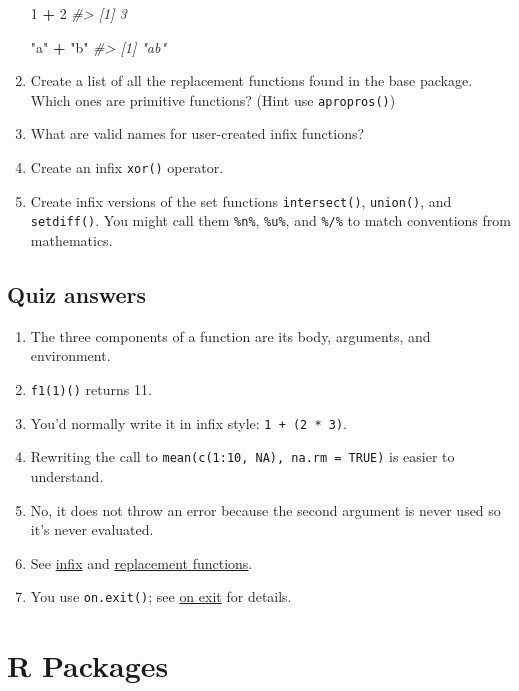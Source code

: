 \documentclass[]{book}
\newenvironment{Shaded}{\begin{snugshade}}{\end{snugshade}}
\newcommand{\CommentTok}[1]{\textcolor[rgb]{0.56,0.35,0.01}{\textit{#1}}}
\newcommand{\DecValTok}[1]{\textcolor[rgb]{0.00,0.00,0.81}{#1}}
\newcommand{\OperatorTok}[1]{\textcolor[rgb]{0.81,0.36,0.00}{\textbf{#1}}}
\newcommand{\StringTok}[1]{\textcolor[rgb]{0.31,0.60,0.02}{#1}}
\theoremstyle{definition}
\theoremstyle{definition}
\theoremstyle{definition}
\theoremstyle{remark}
\begin{document}
\begin{enumerate}
\begin{Shaded}
\begin{Highlighting}[]
\DecValTok{1} \OperatorTok{+}\StringTok{ }\DecValTok{2}
\CommentTok{#> [1] 3}

\StringTok{"a"} \OperatorTok{+}\StringTok{ "b"}
\CommentTok{#> [1] "ab"}
\end{Highlighting}
\end{Shaded}
\item
  Create a list of all the replacement functions found in the base
  package. Which ones are primitive functions? (Hint use
  \texttt{apropros()})
\item
  What are valid names for user-created infix functions?
\item
  Create an infix \texttt{xor()} operator.
\item
  Create infix versions of the set functions \texttt{intersect()},
  \texttt{union()}, and \texttt{setdiff()}. You might call them
  \texttt{\%n\%}, \texttt{\%u\%}, and \texttt{\%/\%} to match
  conventions from mathematics.
\end{enumerate}

\hypertarget{function-answers}{%
\section{Quiz answers}\label{function-answers}}

\begin{enumerate}
\def\labelenumi{\arabic{enumi}.}
\item
  The three components of a function are its body, arguments, and
  environment.
\item
  \texttt{f1(1)()} returns 11.
\item
  You'd normally write it in infix style: \texttt{1\ +\ (2\ *\ 3)}.
\item
  Rewriting the call to \texttt{mean(c(1:10,\ NA),\ na.rm\ =\ TRUE)} is
  easier to understand.
\item
  No, it does not throw an error because the second argument is never
  used so it's never evaluated.
\item
  See \protect\hyperlink{infix-functions}{infix} and
  \protect\hyperlink{replacement-functions}{replacement functions}.
\item
  You use \texttt{on.exit()}; see \protect\hyperlink{on-exit}{on exit}
  for details.
\end{enumerate}

\hypertarget{r-packages}{%
\chapter{R Packages}\label{r-packages}}
\end{document}
